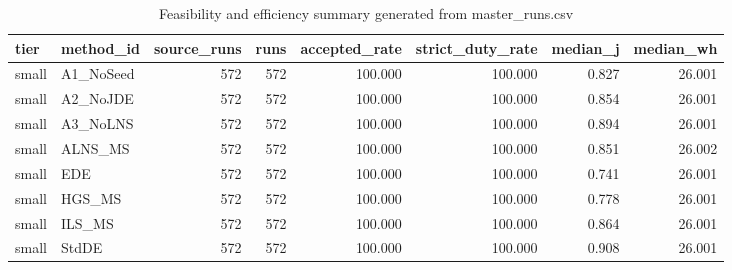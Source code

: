 \begin{table}[!t]
\centering
\caption{Feasibility and efficiency summary generated from master_runs.csv}
\label{tab:feasibility_summary_generated}
\begin{tabular}{llrrrrrr}
\toprule
tier & method_id & source_runs & runs & accepted_rate & strict_duty_rate & median_j & median_wh \\
\midrule
small & A1_NoSeed & 572 & 572 & 100.000 & 100.000 & 0.827 & 26.001 \\
small & A2_NoJDE & 572 & 572 & 100.000 & 100.000 & 0.854 & 26.001 \\
small & A3_NoLNS & 572 & 572 & 100.000 & 100.000 & 0.894 & 26.001 \\
small & ALNS_MS & 572 & 572 & 100.000 & 100.000 & 0.851 & 26.002 \\
small & EDE & 572 & 572 & 100.000 & 100.000 & 0.741 & 26.001 \\
small & HGS_MS & 572 & 572 & 100.000 & 100.000 & 0.778 & 26.001 \\
small & ILS_MS & 572 & 572 & 100.000 & 100.000 & 0.864 & 26.001 \\
small & StdDE & 572 & 572 & 100.000 & 100.000 & 0.908 & 26.001 \\
\bottomrule
\end{tabular}

\end{table}
